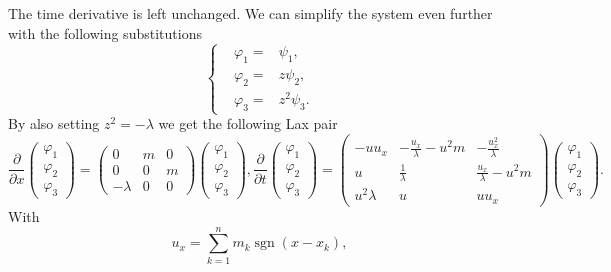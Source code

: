 \documentclass[english,master]{liumaiex}
\theoremstyle{plain}
\theoremstyle{definition}
\DeclareMathOperator{\sgn}{sgn}
\begin{document}
The time derivative is left unchanged. We can simplify the system even further with the following substitutions
\begin{equation}
\left\{ \begin{aligned}
	&\varphi_1 = &\psi_1, \\
	&\varphi_2 = &z\psi_2, \\
	&\varphi_3 = &z^2\psi_3.
\end{aligned} \right.
\end{equation}
By also setting $z^2 = -\lambda$ we get the following Lax pair
\begin{subequations}
\begin{equation}
\frac{\partial}{\partial x}
\begin{pmatrix} \varphi_1 \\ \varphi_2 \\ \varphi_3 \end{pmatrix} =
\begin{pmatrix}
	0 & m & 0 \\
	0 & 0 & m \\
	-\lambda & 0 & 0
\end{pmatrix}
\begin{pmatrix} \varphi_1 \\ \varphi_2 \\ \varphi_3 \end{pmatrix}
,
\end{equation}
\begin{equation}
\frac{\partial}{\partial t}
\begin{pmatrix} \varphi_1 \\ \varphi_2 \\ \varphi_3 \end{pmatrix} =
\begin{pmatrix}
	-u u_x & -\frac{u_x}{\lambda}-u^2 m & -\frac{u_x^2}{\lambda} \\
	u & \frac{1}{\lambda} & \frac{u_x}{\lambda} - u^2 m \\
	u^2\lambda & u & uu_x
\end{pmatrix}
\begin{pmatrix} \varphi_1 \\ \varphi_2 \\ \varphi_3 \end{pmatrix}
.
\end{equation}
\end{subequations}
%
%
With
\begin{equation}
	u_x = \sum_{k=1}^n m_k \sgn(x - x_k),
\end{equation}
\end{document}
